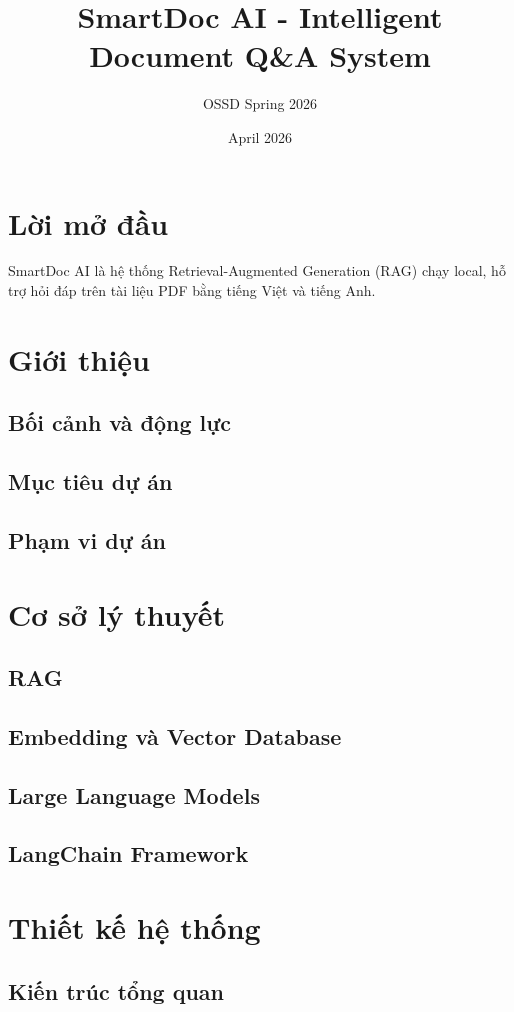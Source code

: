 \documentclass[12pt,a4paper]{article}
\title{SmartDoc AI - Intelligent Document Q\&A System}
\author{OSSD Spring 2026}
\date{April 2026}
\begin{document}
\maketitle

\section*{Lời mở đầu}
SmartDoc AI là hệ thống Retrieval-Augmented Generation (RAG) chạy local, hỗ trợ hỏi đáp trên tài liệu PDF bằng tiếng Việt và tiếng Anh.

\section{Giới thiệu}
\subsection{Bối cảnh và động lực}
\subsection{Mục tiêu dự án}
\subsection{Phạm vi dự án}

\section{Cơ sở lý thuyết}
\subsection{RAG}
\subsection{Embedding và Vector Database}
\subsection{Large Language Models}
\subsection{LangChain Framework}

\section{Thiết kế hệ thống}
\subsection{Kiến trúc tổng quan}
\end{document}
